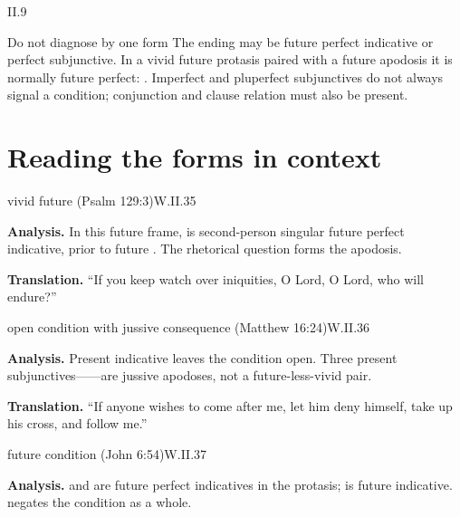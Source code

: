 \begin{courseunit}{II.9}
\begin{grammarbox}{Do not diagnose by one form}
The ending  may be future perfect indicative or perfect subjunctive.  In a vivid
future protasis paired with a future apodosis it is normally future perfect:
.  Imperfect and pluperfect subjunctives do not always signal a
condition; conjunction and clause relation must also be present.
\end{grammarbox}

\section{Reading the forms in context}

\begin{workedexample}{vivid future (Psalm 129:3)}{W.II.35}

\textbf{Analysis.}  In this future frame,  is second-person singular
future perfect indicative, prior to future .  The rhetorical question forms
the apodosis.

\textbf{Translation.}  ``If you keep watch over iniquities, O Lord, O Lord, who will endure?''
\end{workedexample}

\begin{workedexample}{open condition with jussive consequence (Matthew 16:24)}{W.II.36}

\textbf{Analysis.}  Present indicative  leaves the condition open.  Three present
subjunctives------are jussive apodoses, not a future-less-vivid
pair.

\textbf{Translation.}  ``If anyone wishes to come after me, let him deny himself, take up his
cross, and follow me.''
\end{workedexample}

\begin{workedexample}{future condition (John 6:54)}{W.II.37}

\textbf{Analysis.}   and  are future perfect
indicatives in the protasis;  is future indicative.   negates the
condition as a whole.


\end{workedexample}
\end{courseunit}
